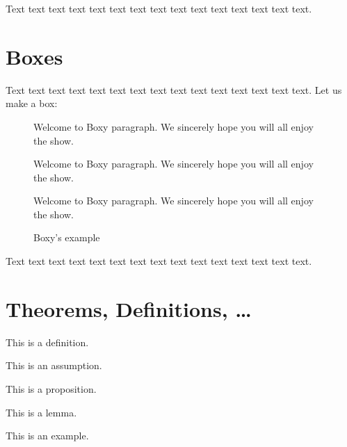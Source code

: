 Text text text text text text text text text text text text text text text.

\section{Boxes}

Text text text text text text text text text text text text text text text. Let us make a box:

\begin{figure}[!htbp]
\begin{center}
\caption{Boxy's example}\label{box:values}
\begin{boxeditemize}
	\item Welcome to Boxy paragraph. 
We sincerely hope you will
all enjoy the show.
	\item
Welcome to Boxy paragraph.
We sincerely hope you will
all enjoy the show.
	\item 
Welcome to Boxy paragraph.
We sincerely hope you will
all enjoy the show.
\end{boxeditemize}
\end{center}
\begin{source}\cite{Haaparanta1996}\end{source}
\end{figure}

Text text text text text text text text text text text text text text text.

\section{Theorems, Definitions, \ldots}

\begin{defin}\label{de:definice1}
This is a definition.
\end{defin}

\begin{ass}\label{as:predpoklad1}
This is an assumption.
\end{ass}

\begin{prop}\label{pr:veta1}
This is a proposition.
\end{prop}

\begin{lemma}\label{le:lemma1}
This is a lemma.
\end{lemma}

\begin{exam}\label{ex:priklad1}
This is an example.
\end{exam}

